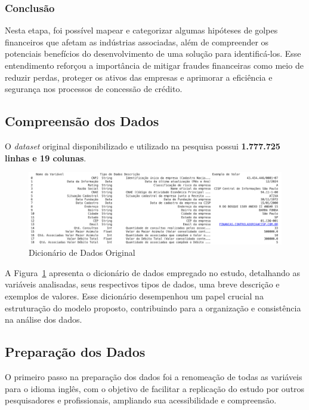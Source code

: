 \documentclass[12pt,a4paper]{article}
\begin{document}
\subsubsection{Conclusão}
Nesta etapa, foi possível mapear e categorizar algumas hipóteses de golpes financeiros que afetam as indústrias associadas, além de compreender os potenciais benefícios do desenvolvimento de uma solução para identificá-los. Esse entendimento reforçou a importância de mitigar fraudes financeiras como meio de reduzir perdas, proteger os ativos das empresas e aprimorar a eficiência e segurança nos processos de concessão de crédito.
\subsection{Compreensão dos Dados}

O \textit{dataset} original disponibilizado e utilizado na pesquisa possui \textbf{1.777.725 linhas e 19 colunas}. 

\begin{figure}[H]
    \centering
    \includegraphics[width=\textwidth]{dicionariodedados.png}
    \caption{Dicionário de Dados Original}
    \label{fig:dicionario_dados}
\end{figure}


A Figura~\ref{fig:dicionario_dados} apresenta o dicionário de dados empregado no estudo, detalhando as variáveis analisadas, seus respectivos tipos de dados, uma breve descrição e exemplos de valores. Esse dicionário desempenhou um papel crucial na estruturação do modelo proposto, contribuindo para a organização e consistência na análise dos dados.

\subsection{Preparação dos Dados}

O primeiro passo na preparação dos dados foi a renomeação de todas as variáveis para o idioma inglês, com o objetivo de facilitar a replicação do estudo por outros pesquisadores e profissionais, ampliando sua acessibilidade e compreensão.
\end{document}
